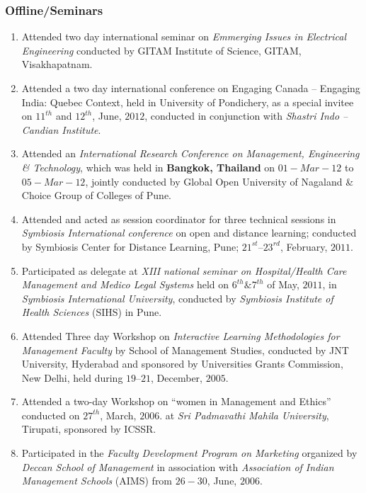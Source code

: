 \documentclass[10pt]{article}
\begin{document}
\subsubsection{Offline/Seminars}
\begin{enumerate} 

\item Attended two day international seminar on \emph{Emmerging Issues in Electrical Engineering} conducted by GITAM Institute of Science, GITAM, Visakhapatnam. 

\item Attended a two day international conference on Engaging Canada – Engaging India: Quebec Context, held in University of Pondichery, as a special invitee on $11^{th}$ and $12^{th}$, June, $2012$, conducted in conjunction with \textit{Shastri Indo – Candian Institute}.

\item Attended an \textit{International Research Conference on Management, Engineering & Technology}, which was held in \textbf{Bangkok, Thailand} on $01-Mar-12$ to $05-Mar-12$, jointly conducted by Global Open University of Nagaland & Choice Group of Colleges of Pune.

\item Attended and acted as session coordinator for three technical sessions in \textit{Symbiosis International conference} on open and distance learning; conducted by Symbiosis Center for Distance Learning, Pune; $21^{st} – 23^{rd}$, February, $2011$.

\item Participated as delegate at \textit{XIII national seminar on Hospital/Health Care Management and Medico  Legal Systems} held on $6^{th} \& 7^{th}$ of May, $2011$, in \textit{Symbiosis International University}, conducted by \textit{Symbiosis Institute of Health Sciences} (SIHS) in Pune.

\item Attended Three day Workshop on \textit{Interactive Learning Methodologies for Management Faculty} by  School of Management Studies, conducted by JNT University, Hyderabad and sponsored by Universities Grants Commission, New Delhi, held during $19 – 21$, December, $2005$.

\item Attended a two-day Workshop on \enquote{women in Management and Ethics} conducted on $27^{th}$, March, $2006$. at \textit{Sri Padmavathi Mahila University}, Tirupati, sponsored by ICSSR.

\item Participated in the \textit{Faculty Development Program on Marketing} organized by \textit{Deccan School of Management} in association with \textit{Association of Indian Management Schools} (AIMS) from $26 -30$, June, $2006$.


\end{enumerate}
\end{document}
